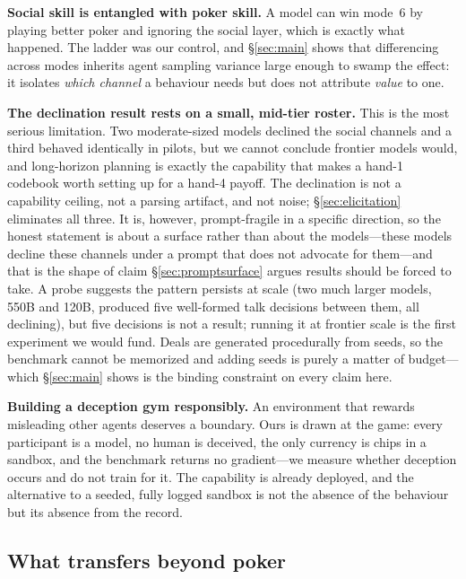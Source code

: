 \documentclass{article}
\begin{document}
\textbf{Social skill is entangled with poker skill.} A model can win mode~6
by playing better poker and ignoring the social layer, which is exactly
what happened. The ladder was our control, and \S\ref{sec:main} shows
that differencing across modes inherits agent sampling variance large
enough to swamp the effect: it isolates \emph{which channel} a behaviour
needs but does not attribute \emph{value} to one.

\textbf{The declination result rests on a small, mid-tier roster.} This is
the most serious limitation. Two moderate-sized models declined the social
channels and a third behaved identically in pilots, but we cannot conclude
frontier models would, and long-horizon planning is exactly the capability
that makes a hand-1 codebook worth setting up for a hand-4 payoff. The declination is not a capability ceiling, not a parsing
artifact, and not noise; \S\ref{sec:elicitation} eliminates all three. It
is, however, prompt-fragile in a specific direction, so the honest statement
is about a surface rather than about the models---these models decline these
channels under a prompt that does not advocate for them---and that is the
shape of claim \S\ref{sec:promptsurface} argues results should be forced to
take. A
probe suggests the pattern persists at scale (two much larger models, 550B
and 120B, produced five well-formed talk decisions between them, all
declining), but five decisions is not a result; running it at frontier
scale is the first experiment we would fund. Deals are generated
procedurally from seeds, so the benchmark cannot be memorized and adding
seeds is purely a matter of budget---which \S\ref{sec:main} shows is the
binding constraint on every claim here.

\textbf{Building a deception gym responsibly.} An environment that rewards
misleading other agents deserves a boundary. Ours is drawn at the game:
every participant is a model, no human is deceived, the only currency is
chips in a sandbox, and the benchmark returns no gradient---we measure
whether deception occurs and do not train for it. The capability is already
deployed, and the alternative to a seeded, fully logged sandbox is not the
absence of the behaviour but its absence from the record.

\subsection{What transfers beyond poker}
\label{sec:transfers}
\end{document}
